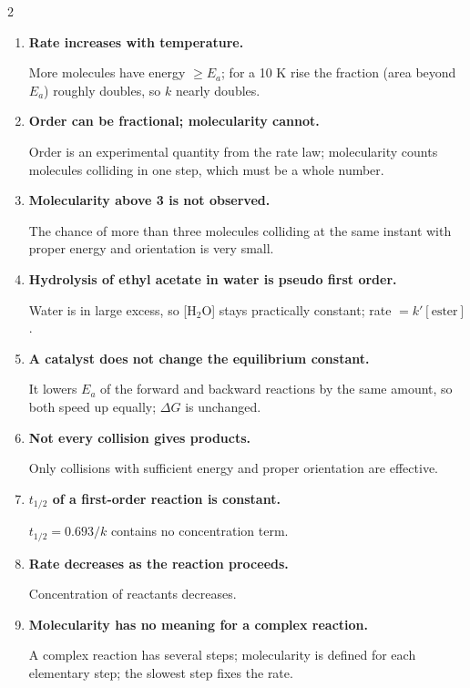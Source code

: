 \documentclass[10pt,a4paper]{extarticle}
\newenvironment{rqlist}{\begin{enumerate}[leftmargin=12pt,label={\sffamily\bfseries\scriptsize\color{uc}\arabic*.},itemsep=1pt]}{\end{enumerate}}
\newcommand{\ans}{\par\hspace*{2pt}{\color{uc}$\hookrightarrow$}\;}
\begin{document}
\begin{multicols}{2}
\begin{rqlist}
\item \textbf{Rate increases with temperature.}\ans More molecules have energy $\ge E_a$; for a 10 K rise the fraction (area beyond $E_a$) roughly doubles, so $k$ nearly doubles.
\item \textbf{Order can be fractional; molecularity cannot.}\ans Order is an experimental quantity from the rate law; molecularity counts molecules colliding in one step, which must be a whole number.
\item \textbf{Molecularity above 3 is not observed.}\ans The chance of more than three molecules colliding at the same instant with proper energy and orientation is very small.
\item \textbf{Hydrolysis of ethyl acetate in water is pseudo first order.}\ans Water is in large excess, so [H$_2$O] stays practically constant; rate $=k'[\text{ester}]$.
\item \textbf{A catalyst does not change the equilibrium constant.}\ans It lowers $E_a$ of the forward and backward reactions by the same amount, so both speed up equally; $\Delta G$ is unchanged.
\item \textbf{Not every collision gives products.}\ans Only collisions with sufficient energy and proper orientation are effective.
\item \textbf{$t_{1/2}$ of a first-order reaction is constant.}\ans $t_{1/2}=0.693/k$ contains no concentration term.
\item \textbf{Rate decreases as the reaction proceeds.}\ans Concentration of reactants decreases.
\item \textbf{Molecularity has no meaning for a complex reaction.}\ans A complex reaction has several steps; molecularity is defined for each elementary step; the slowest step fixes the rate.
\end{rqlist}


\end{multicols}
\end{document}
